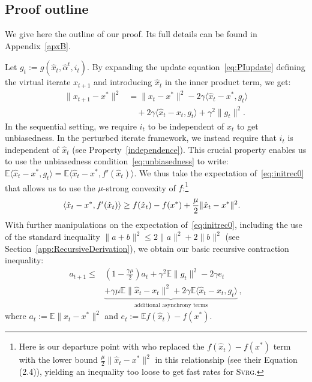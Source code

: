 \documentclass[twoside]{article}
\newcommand{\stepsize}{\gamma}
\newcommand{\strongconvex}{\mu}
\newcommand{\E}{\mathbb{E}}
\newcommand{\SVRG}{\textsc{Svrg}}
\begin{document}
\vspace{-2mm}
\subsection{Proof outline}\label{proofoutline}
\vspace{-2mm}
We give here the outline of our proof. Its full details can be found in Appendix~\ref{apxB}.

Let $g_t := g(\hat x_t, \hat \alpha^t, i_t)$. By expanding the update equation~\eqref{eq:PIupdate} defining the virtual iterate $x_{t+1}$ and introducing $\hat x_t$ in the inner product term, we get:
\begin{equation}\label{eq:initrec0}
\begin{aligned}
\|x_{t+1} - x^*\|^2
&= \|x_t -x^*\|^2 
-2\stepsize\langle \hat x_t -x^*,  g_t\rangle 
\\
&\quad+2\stepsize\langle \hat x_t -x_t,  g_t\rangle 
+ \stepsize^2 \|g_t\|^2 .
\end{aligned}
\end{equation}
In the sequential setting, we require $i_t$ to be independent of $x_t$ to get unbiasedness. 
In the perturbed iterate framework, we instead require that $i_t$ is independent of $\hat x_t$ (see Property~\ref{independence}). 
This crucial property enables us to use the unbiasedness condition~\eqref{eq:unbiasedness} to write:
$\E \langle \hat x_t -x^*,  g_t\rangle 
= \E \langle \hat x_t -x^*,  f'(\hat x_t)\rangle$. We thus take the expectation of~\eqref{eq:initrec0} that allows us to use the $\mu$-strong convexity of $f$:\footnote{Here is our departure point with \citet{mania} who replaced the $f(\hat{x}_t)-f(x^*)$ term with the lower bound $\frac{\strongconvex}{2}\|\hat x_t - x^*\|^2$ in this relationship (see their Equation (2.4)), yielding an inequality too loose to get fast rates for \SVRG.} 
\begin{align}
\langle \hat x_t -x^*,  f'(\hat x_t)\rangle &\geq f(\hat x_t) -f(x^*) +\frac{\strongconvex}{2}\|\hat x_t - x^*\|^2 . \notag
\end{align}
With further manipulations on the expectation of~\eqref{eq:initrec0}, including the use of the standard inequality $\|a + b\|^2 \leq 2\|a\|^2 + 2\|b\|^2$ (see Section~\ref{app:RecursiveDerivation}), we obtain our basic recursive contraction inequality:
\begin{equation}
\begin{aligned} \label{eq:RecursiveIneq1}
a_{t+1} \leq 
&(1 -\frac{\stepsize \strongconvex}{2}) a_t 
+ \stepsize^2 \E \|g_t\|^2 -2\stepsize e_t
\\
&\underbrace{
	+ \stepsize\strongconvex \E\|\hat x_t - x_t\|^2 
	+ 2\stepsize \E \langle \hat x_t -x_t,  g_t\rangle
}_{\text{additional asynchrony terms}}\,,
\end{aligned}
\end{equation}
where $a_t := \E \|x_t - x^*\|^2$ and $e_t := \E f(\hat x_t) - f(x^*)$.
\end{document}

